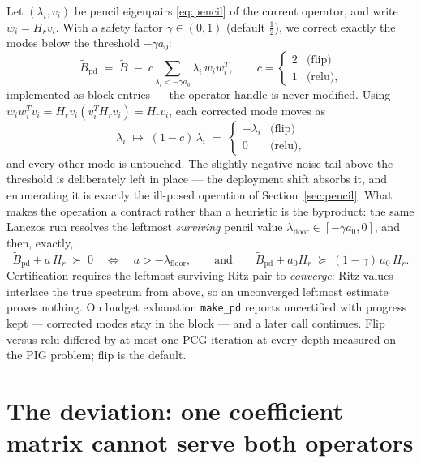 \documentclass[11pt]{article}
\newcommand{\Bt}{\widetilde{B}}
\newcommand{\Hr}{H_r}
\newcommand{\floor}{\lambda_{\mathrm{floor}}}
\begin{document}
Let $(\lambda_i, v_i)$ be pencil eigenpairs \eqref{eq:pencil} of the
current operator, and write $w_i = \Hr v_i$. With a safety factor
$\gamma \in (0,1)$ (default $\tfrac12$), we correct exactly the modes
below the threshold $-\gamma a_0$:
\begin{equation}
  \Bt_{\mathrm{pd}}
  \;=\; \Bt \;-\; c \sum_{\lambda_i < -\gamma a_0}
        \lambda_i\, w_i w_i^T,
  \qquad
  c = \begin{cases} 2 & \text{(flip)}\\ 1 & \text{(relu)}, \end{cases}
  \label{eq:flip}
\end{equation}
implemented as block entries --- the operator handle is never modified.
Using $w_i w_i^T v_i = \Hr v_i (v_i^T \Hr v_i) = \Hr v_i$, each corrected
mode moves as
\begin{equation}
  \lambda_i \;\longmapsto\; (1 - c)\,\lambda_i
  \;=\; \begin{cases} -\lambda_i & \text{(flip)}\\
                      0 & \text{(relu)}, \end{cases}
  \label{eq:flip-move}
\end{equation}
and every other mode is untouched. The slightly-negative noise tail above
the threshold is deliberately left in place --- the deployment shift
absorbs it, and enumerating it is exactly the ill-posed operation of
Section~\ref{sec:pencil}. What makes the operation a contract rather than
a heuristic is the byproduct: the same Lanczos run resolves the leftmost
\emph{surviving} pencil value $\floor \in [-\gamma a_0, 0]$, and then,
exactly,
\begin{equation}
  \Bt_{\mathrm{pd}} + a\,\Hr \;\succ\; 0
  \quad\Longleftrightarrow\quad
  a > -\floor,
  \qquad\text{and}\qquad
  \Bt_{\mathrm{pd}} + a_0 \Hr \;\succeq\; (1-\gamma)\, a_0\, \Hr.
  \label{eq:flip-contract}
\end{equation}
Certification requires the leftmost surviving Ritz pair to
\emph{converge}: Ritz values interlace the true spectrum from above, so
an unconverged leftmost estimate proves nothing. On budget exhaustion
\texttt{make\_pd} reports uncertified with progress kept --- corrected
modes stay in the block --- and a later call continues. Flip versus relu
differed by at most one PCG iteration at every depth measured on the PIG
problem; flip is the default.

\section{The deviation: one coefficient matrix cannot serve both
operators}
\label{sec:deviation}
\end{document}
